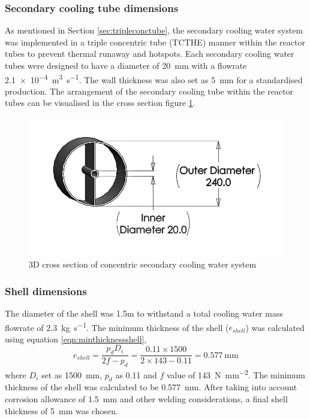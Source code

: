 \subsubsection{Secondary cooling tube dimensions}
As mentioned in Section \ref{sec:tripleconctube}, the secondary cooling water system was implemented in a triple concentric tube (TCTHE) manner within the reactor tubes to prevent thermal runaway and hotspots. Each secondary cooling water tubes were designed to have a diameter of \SI{20}{\milli \metre} with a flowrate \SI{2.1e-4}{\cubic\m\per\s}. The wall thickness was also set as \SI{5}{\milli \metre} for a standardised production. 
The arrangement of the secondary cooling tube within the reactor tubes can be visualised in the cross section figure \ref{fig:concentriccoolingwater}. 
\begin{figure}[H]
    \centering
    \includegraphics[width=0.65\linewidth]{chapters/2-reaction/figures/FYD conc tube with calc bw.png} 
    \caption{3D cross section of concentric secondary cooling water system}
    \label{fig:concentriccoolingwater}
\end{figure}

\subsubsection{Shell dimensions}
The diameter of the shell was 1.5m to withstand a total cooling water mass flowrate of \SI{2.3}{\kilogram \per \second}.
The minimum thickness of the shell ($e_{shell}$) was calculated using equation \cref{eqn:minthicknessshell},
\begin{equation}
    e_{shell} = \frac{p_dD_i}{2f-p_d} = \frac{0.11 \times 1500}{2 \times 143 - 0.11} = \SI{0.577}{\mm}
    \label{eqn:minthicknessshell}
\end{equation}
where $D_i$ set as \SI{1500}{\milli \metre}, $p_d$ as 0.11 and $f$ value of \SI{143}{\N\per\square\mm}. The minimum thickness of the shell was calculated to be \SI{0.577}{\milli \metre}. After taking into account corrosion allowance of \SI{1.5}{\milli \metre} and other welding considerations, a final shell thickness of \SI{5}{\milli \metre} was chosen. 

